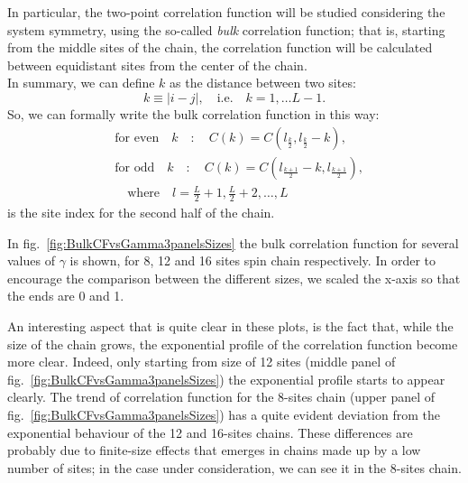 In particular, the two-point correlation function will be studied considering the system symmetry, using the so-called \emph{bulk} correlation function; that is, starting from the middle sites of the chain, the correlation function will be calculated between equidistant sites from the center of the chain.
\\In summary, we can define $k$ as the distance between two sites:
\begin{equation*}
    k \equiv |i-j|, \quad \text{i.e.} \quad k = 1, \dots L-1.
\end{equation*}
So, we can formally write the bulk correlation function in this way:
\begin{equation*}
\begin{split}
    &\text{for even} \quad k \quad : \quad C(k) = C(l_{\frac{k}{2}}, l_{\frac{k}{2}}-k),\\
    &\text{for odd} \quad k \quad : \quad C(k) = C(l_{\frac{k+1}{2}}-k, l_{\frac{k+1}{2}}),\\
    & \quad \text{where} \quad l = \frac{L}{2}+1, \frac{L}{2}+2, \dots, L
\end{split}
\end{equation*}
is the site index for the second half of the chain.

In fig.~\ref{fig:BulkCFvsGamma3panelsSizes} the bulk correlation function for several values of $\gamma$ is shown, for 8, 12 and 16 sites spin chain respectively. In order to encourage the comparison between the different sizes, we scaled the x-axis so that the ends are 0 and 1. 


An interesting aspect that is quite clear in these plots, is the fact that, while the size of the chain grows, the exponential profile of the correlation function become more clear. Indeed, only starting from size of 12 sites (middle panel of fig.~\ref{fig:BulkCFvsGamma3panelsSizes}) the exponential profile starts to appear clearly. The trend of correlation function for the 8-sites chain (upper panel of fig.~\ref{fig:BulkCFvsGamma3panelsSizes}) has a quite evident deviation from the exponential behaviour of the 12 and 16-sites chains. These differences are probably due to finite-size effects that emerges in chains made up by a low number of sites; in the case under consideration, we can see it in the 8-sites chain.

